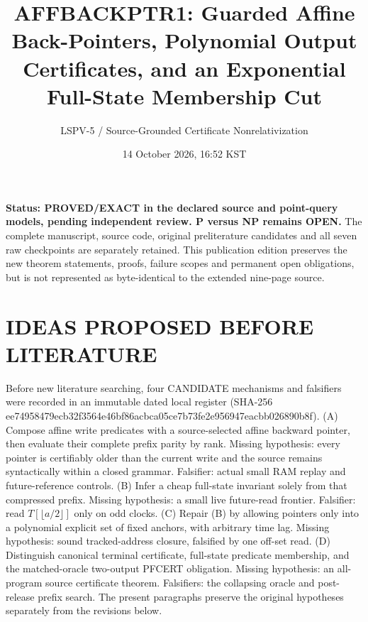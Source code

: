 \documentclass[11pt]{article}
\title{AFFBACKPTR1: Guarded Affine Back-Pointers, Polynomial Output Certificates, and an Exponential Full-State Membership Cut}
\author{LSPV-5 / Source-Grounded Certificate Nonrelativization}
\date{14 October 2026, 16:52 KST}
\begin{document}
\maketitle
\noindent\textbf{Status: PROVED/EXACT in the declared source and point-query models, pending independent review. P versus NP remains OPEN.}
The complete manuscript, source code, original preliterature candidates and all seven raw checkpoints are separately retained. This publication edition preserves the new theorem statements, proofs, failure scopes and permanent open obligations, but is not represented as byte-identical to the extended nine-page source.

\section{IDEAS PROPOSED BEFORE LITERATURE}
Before new literature searching, four CANDIDATE mechanisms and falsifiers were recorded in an immutable dated local register (SHA-256 ee74958479ecb32f3564e46bf86acbca05ce7b73fe2e956947eacbb026890b8f). (A) Compose affine write predicates with a source-selected affine backward pointer, then evaluate their complete prefix parity by rank. Missing hypothesis: every pointer is certifiably older than the current write and the source remains syntactically within a closed grammar. Falsifier: actual small RAM replay and future-reference controls. (B) Infer a cheap full-state invariant solely from that compressed prefix. Missing hypothesis: a small live future-read frontier. Falsifier: read \(T[\lfloor a/2\rfloor]\) only on odd clocks. (C) Repair (B) by allowing pointers only into a polynomial explicit set of fixed anchors, with arbitrary time lag. Missing hypothesis: sound tracked-address closure, falsified by one off-set read. (D) Distinguish canonical terminal certificate, full-state predicate membership, and the matched-oracle two-output PFCERT obligation. Missing hypothesis: an all-program source certificate theorem. Falsifiers: the collapsing oracle and post-release prefix search. The present paragraphs preserve the original hypotheses separately from the revisions below.
\end{document}
